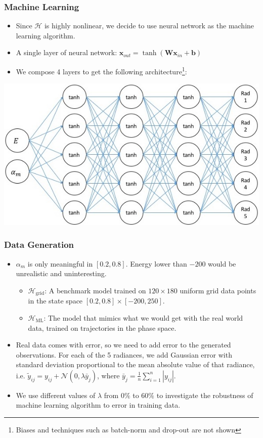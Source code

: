 \documentclass{beamer}
\newcommand{\vx}{\bm{x}}
\newcommand{\vW}{\bm{W}}
\newcommand{\vb}{\bm{b}}
\newcommand{\cN}{\mathcal{N}}
\newcommand{\cH}{\mathcal{H}}
\begin{document}
\begin{frame}
\frametitle{Machine Learning}
\begin{itemize}
\item
Since $\cH$ is highly nonlinear, we decide to use neural network as the machine learning algorithm.
\item A single layer of neural network: $\vx_{out}=\tanh(\vW \vx_{in}+\vb)$
\item
We compose 4 layers to get the following architecture\footnote{Biases and techniques such as batch-norm and drop-out are not shown}:
\end{itemize}
\centering
\includegraphics[width=0.6\linewidth]{Figures/FNN.jpeg}

\end{frame}

\begin{frame}
\frametitle{Data Generation}
\begin{itemize}
\item $\alpha_m$ is only meaningful in $[0.2,0.8]$. Energy lower than $-200$ would be unrealistic and uninteresting.
\begin{itemize}
	\item $\cH_{\text{grid}}$: A benchmark model trained on $120\times 180$ uniform grid data points in the state space $[0.2,0.8]\times [-200,250]$.
	\item $\cH_{\text{ML}}$: The model that mimics what we would get with the real world data, trained on trajectories in the phase space.
\end{itemize}
\item Real data comes with error, so we need to add error to the generated observations. For each of the 5 radiances, we add Gaussian error with standard deviation proportional to the mean absolute value of that radiance, i.e. $\tilde{y}_{ij} = y_{ij} + \cN(0,\lambda \bar{y}_j)$, where $\bar{y}_j =\frac{1}{n} \sum_{i=1}^n | y_{ij} |$.\par
\item We use different values of $\lambda$ from $0\%$ to $60\%$ to investigate the robustness of machine learning algorithm to error in training data.
\end{itemize}
\end{frame}
\end{document}
